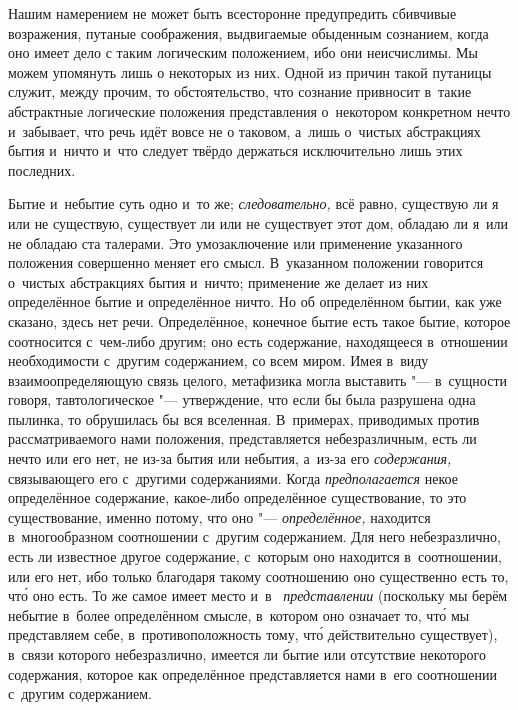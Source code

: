 Нашим намерением не может быть всесторонне предупредить сбивчивые возражения,
путаные соображения, выдвигаемые обыденным сознанием, когда оно имеет дело с
таким логическим положением, ибо они неисчислимы. Мы можем упомянуть лишь о
некоторых из них. Одной из причин такой путаницы служит, между прочим, то
обстоятельство, что сознание привносит в~такие абстрактные логические положения
представления о~некотором конкретном нечто и~забывает, что речь идёт вовсе не о
таковом, а~лишь о~чистых абстракциях бытия и~ничто и~что следует твёрдо
держаться исключительно лишь этих последних.

Бытие и~небытие суть одно и~то же; {\em следовательно,} всё равно, существую ли
я или не существую, существует ли или не существует этот дом, обладаю ли я~или
не обладаю ста талерами. Это умозаключение или применение указанного положения
совершенно меняет его смысл. В~указанном положении говорится о~чистых
абстракциях бытия и~ничто; применение же делает из них определённое бытие и
определённое ничто. Но об определённом бытии, как уже сказано, здесь нет речи.
Определённое, конечное бытие есть такое бытие, которое соотносится с~чем-либо
другим; оно есть содержание, находящееся в~отношении необходимости с~другим
содержанием, со всем миром. Имея в~виду взаимоопределяющую связь целого,
метафизика могла выставить "--- в~сущности говоря, тавтологическое "---
утверждение, что если бы была разрушена одна пылинка, то обрушилась бы вся
вселенная. В~примерах, приводимых против рассматриваемого нами положения,
представляется небезразличным, есть ли нечто или его нет, не из-за бытия или
небытия, а~из-за его {\em содержания,} связывающего его с~другими содержаниями.
Когда {\em предполагается} некое определённое содержание, какое-либо
определённое существование, то это существование, именно потому, что оно "---
{\em определённое,} находится в~многообразном соотношении с~другим содержанием.
Для него небезразлично, есть ли известное другое содержание, с~которым оно
находится в~соотношении, или его нет, ибо только благодаря такому соотношению
оно существенно есть то, чт\'{о} оно есть. То же самое имеет место и~в~{\em
представлении} (поскольку мы берём небытие в~более определённом смысле,
в~котором оно означает то, чт\'{о} мы представляем себе, в~противоположность
тому, чт\'{о} действительно существует), в~связи которого небезразлично,
имеется ли бытие или отсутствие некоторого содержания, которое как определённое
представляется нами в~его соотношении с~другим содержанием. \label{bkm:bm85a}


